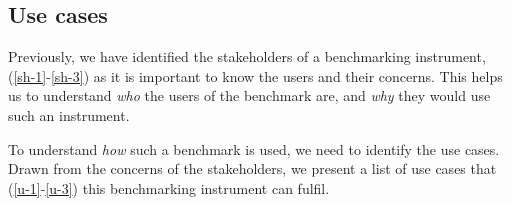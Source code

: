 \subsection{Use cases}
\label{sec:system:requirements-analysis:use-cases}

Previously, we have identified the stakeholders of a benchmarking instrument, (\ref{sh-1}-\ref{sh-3}) as it is important to know the users and their concerns. This helps us to understand \textit{who} the users of the benchmark are, and \textit{why} they would use such an instrument.

To understand \textit{how} such a benchmark is used, we need to identify the use cases. Drawn from the concerns of the stakeholders, we present a list of use cases that (\ref{u-1}-\ref{u-3}) this benchmarking instrument can fulfil.

